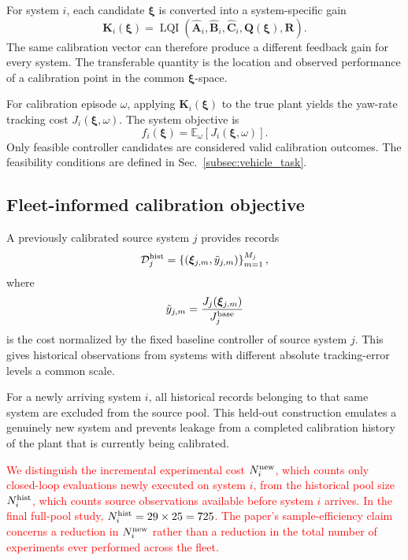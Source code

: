 \documentclass[conference]{IEEEtran}
\newcommand{\rev}[1]{\textcolor{red}{#1}}
\newcommand{\calD}{\mathcal{D}}
\begin{document}
For system $i$, each candidate $\boldsymbol{\xi}$ is converted into a system-specific gain
\begin{equation}
 \mathbf{K}_i(\boldsymbol{\xi})=\operatorname{LQI}\!\left(\hat{\mathbf{A}}_i,\hat{\mathbf{B}}_i,\hat{\mathbf{C}}_i,\mathbf{Q}(\boldsymbol{\xi}),\mathbf{R}\right).
 \label{eq:lqi_gain}
\end{equation}
The same calibration vector can therefore produce a different feedback gain for every system. The transferable quantity is the location and observed performance of a calibration point in the common $\boldsymbol{\xi}$-space.

For calibration episode $\omega$, applying $\mathbf{K}_i(\boldsymbol{\xi})$ to the true plant yields the yaw-rate tracking cost $J_i(\boldsymbol{\xi},\omega)$. The system objective is
\begin{equation}
 f_i(\boldsymbol{\xi})=\mathbb E_{\omega}\!\left[J_i(\boldsymbol{\xi},\omega)\right].
 \label{eq:client_objective}
\end{equation}
Only feasible controller candidates are considered valid calibration outcomes. The feasibility conditions are defined in Sec.~\ref{subsec:vehicle_task}.

\subsection{Fleet-informed calibration objective}
A previously calibrated source system $j$ provides records
\begin{equation}
 \calD_j^{\rm hist}=\left\{\left(\boldsymbol{\xi}_{j,m},\tilde y_{j,m}\right)\right\}_{m=1}^{M_j},
 \label{eq:historical_data}
\end{equation}
where
\begin{equation}
 \tilde y_{j,m}=\frac{J_j(\boldsymbol{\xi}_{j,m})}{J_j^{\rm base}}
 \label{eq:historical_normalization}
\end{equation}
is the cost normalized by the fixed baseline controller of source system $j$. This gives historical observations from systems with different absolute tracking-error levels a common scale.

For a newly arriving system $i$, all historical records belonging to that same system are excluded from the source pool. This held-out construction emulates a genuinely new system and prevents leakage from a completed calibration history of the plant that is currently being calibrated.

\rev{We distinguish the incremental experimental cost $N_i^{\rm new}$, which counts only closed-loop evaluations newly executed on system $i$, from the historical pool size $N_i^{\rm hist}$, which counts source observations available before system $i$ arrives. In the final full-pool study, $N_i^{\rm hist}=29\times25=725$. The paper's sample-efficiency claim concerns a reduction in $N_i^{\rm new}$ rather than a reduction in the total number of experiments ever performed across the fleet.}
\end{document}
